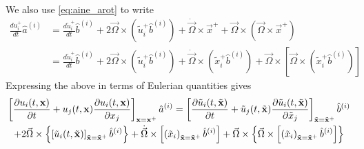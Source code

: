 \documentclass[oneside,a4paper,11pt]{report}
\begin{document}
We also use \cref{eq:aine_arot} to write
\begin{align}
    \frac{du_i^+}{dt} \hat{a}^{(i)} &= \frac{d\tilde{u}_i^+}{dt} \hat{b}^{(i)} + 2 \vec{\Omega} \times \left ( \tilde{u}_i^+ \hat{b}^{(i)} \right ) + \dot{\vec{\Omega}} \times \vec{x}^+ + \vec{\Omega} \times \left ( \vec{\Omega} \times \vec{x}^+ \right ) \nonumber \\
    &= \frac{d\tilde{u}_i^+}{dt} \hat{b}^{(i)} + 2 \vec{\Omega} \times \left ( \tilde{u}_i^+ \hat{b}^{(i)} \right ) + \dot{\vec{\Omega}} \times \left ( \tilde{x}_i^+ \hat{b}^{(i)}\right ) + \vec{\Omega} \times \left [ \vec{\Omega} \times \left ( \tilde{x}_i^+ \hat{b}^{(i)}\right ) \right ]
\end{align}
Expressing the above in terms of Eulerian quantities gives
\begin{multline}
    \label{eq:aine_arot_eulerian}
    \left [ \frac{\partial u_i(t,\mathbf{x})}{\partial t} + u_j(t,\mathbf{x}) \frac{\partial u_i(t,\mathbf{x})}{\partial x_j} \right ]_{\mathbf{x} = \mathbf{x}^+} \hat{a}^{(i)} = \left [ \frac{\partial \tilde{u}_i(t,\tilde{\mathbf{x}})}{\partial t} + \tilde{u}_j(t,\tilde{\mathbf{x}}) \frac{\partial \tilde{u}_i(t,\tilde{\mathbf{x}})}{\partial \tilde{x}_j} \right ]_{\tilde{\mathbf{x}} = \tilde{\mathbf{x}}^+} \hat{b}^{(i)} \\
    + 2 \vec{\Omega} \times \left \{ \left [\tilde{u}_i(t,\tilde{\mathbf{x}}) \right ]_{\tilde{\mathbf{x}} = \tilde{\mathbf{x}}^+} \hat{b}^{(i)} \right \} + \dot{\vec{\Omega}} \times \left [ \left ( \tilde{x}_i \right)_{\tilde{\mathbf{x}} = \tilde{\mathbf{x}}^+} \hat{b}^{(i)}\right ] + \vec{\Omega} \times \left \{ \vec{\Omega} \times \left [ \left ( \tilde{x}_i \right )_{\tilde{\mathbf{x}} = \tilde{\mathbf{x}}^+} \hat{b}^{(i)}\right ] \right \}
\end{multline}
\end{document}
